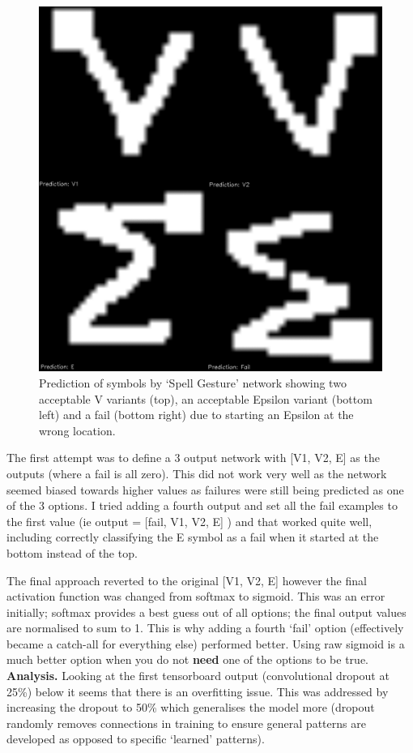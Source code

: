 \documentclass{article}
\begin{document}
\begin{figure}[h!]
	\centering
	\includegraphics[width=0.5\linewidth]{symbolPrediction.png}
	\caption{Prediction of symbols by `Spell Gesture' network showing two acceptable V variants (top), an acceptable Epsilon variant (bottom left) and a fail (bottom right) due to starting an Epsilon at the wrong location.}
	\label{symbolPrediction}
\end{figure}

The first attempt was to define a 3 output network with [V1, V2, E] as the outputs (where a fail is all zero). This did not work very well as the network seemed biased towards higher values as failures were still being predicted as one of the 3 options. I tried adding a fourth output and set all the fail examples to the first value (ie output = [fail, V1, V2, E] ) and that worked quite well, including correctly classifying the E symbol as a fail when it started at the bottom instead of the top. 

The final approach reverted to the original [V1, V2, E] however the final activation function was changed from softmax to sigmoid. This was an error initially; softmax provides a best guess out of all options; the final output values are normalised to sum to 1. This is why adding a fourth `fail' option (effectively became a catch-all for everything else) performed better. Using raw sigmoid is a much better option when you do not \textbf{need} one of the options to be true. \\

\textbf{Analysis.} Looking at the first tensorboard output (convolutional dropout at 25\%) below it seems that there is an overfitting issue. This was addressed by increasing the dropout to 50\% which generalises the model more (dropout randomly removes connections in training to ensure general patterns are developed as opposed to specific `learned' patterns).
\end{document}
